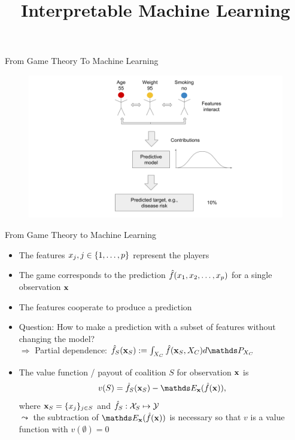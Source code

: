 \documentclass[11pt,compress,t,notes=noshow, aspectratio=169, xcolor=table]{beamer}
\title{Interpretable Machine Learning}
\date{}
\begin{document}
\newcommand{\titlefigure}{figure_man/bike-sharing03.png}
\newcommand{\learninggoals}{
\item See model predictions as a cooperative game
\item Transfer the Shapley value concept from game theory to machine learning
}



\begin{frame}{From Game Theory To Machine Learning}

\begin{figure}
    \centering
    \includegraphics{figure/Shapley_6.png}
\end{figure}

\end{frame}

\begin{frame}{From Game Theory to Machine Learning}
\begin{itemize}[<+->]
    \item The features $x_j, j \in \pset$ represent the players
    \item The game corresponds to the prediction $\fh(x_1, x_2, \ldots, x_p)$ for a single observation $\xv$
    \item The features cooperate to produce a prediction
    \item Question: How to make a prediction with a subset of features without changing the model?
    \\ $\Rightarrow$ Partial dependence: $\fh_{S}(\xv_S) := \int_{X_C} \fh(\xv_S, X_C)d \P_{X_C}$
    \item  The value function / payout of coalition $S$ for observation $\xv$ is
    $$v(S) =  \fh_{S} (\xv_S) - \E_{\xv}(\fh(\xv)),$$ 
    where $\xv_S = \{x_j\}_{j \in S}$ and $\fh_S: \Xspace_S \mapsto \Yspace$ \\ $\leadsto$ the subtraction of $\E_{\xv}(\fh(\xv))$ is necessary so that $v$ is a value function with $v(\emptyset) = 0$
\end{itemize}
\end{frame}
\end{document}
